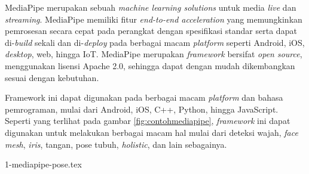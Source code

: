 MediaPipe merupakan sebuah \emph{machine learning solutions} untuk media \emph{live} dan \emph{streaming}.
MediaPipe memiliki fitur \emph{end-to-end acceleration} yang memungkinkan pemrosesan secara cepat pada perangkat dengan spesifikasi standar serta dapat di-\emph{build} sekali dan di-\emph{deploy} pada berbagai macam \emph{platform} seperti Android, iOS, \emph{desktop}, web, hingga IoT.
MediaPipe merupakan \emph{framework} bersifat \emph{open source},
  menggunakan lisensi Apache 2.0, sehingga dapat dengan mudah dikembangkan sesuai dengan kebutuhan.

Framework ini dapat digunakan pada berbagai macam \emph{platform} dan bahasa pemrograman,
  mulai dari Android, iOS, C++, Python, hingga JavaScript.
Seperti yang terlihat pada gambar \ref{fig:contohmediapipe},
  \emph{framework} ini dapat digunakan untuk melakukan berbagai macam hal mulai dari deteksi wajah, \emph{face mesh}, \emph{iris}, tangan, pose tubuh, \emph{holistic}, dan lain sebagainya.

{1-mediapipe-pose.tex}

